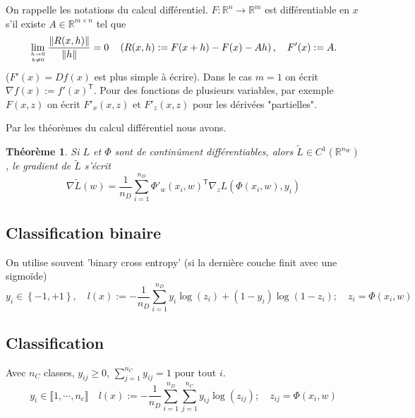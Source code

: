 \documentclass[11pt,a4paper]{article}
\newcommand{\nparammodel}{n_W}
\newcommand{\ndata}{n_D}
\newcommand{\R}{\mathbb R}
\newcommand{\norm}[1]{\|#1\|}
\newcommand{\Set}[1]{\left\{#1\right\}}
\newcommand{\transpose}[1]{{#1}^{\mathsf{T}}}
\newtheorem{theorem}{Théorème}[section]
\begin{document}
%
On rappelle les notations du calcul différentiel. $F:\R^n\to\R^m$ est différentiable en $x$ s'il existe $A\in\R^{m\times n}$ tel que 
\begin{align*}
\lim_{h\to 0\atop h\ne0}\frac{\norm{R(x,h)}}{\norm{h}} = 0\quad \left(R(x,h) := F(x+h)-F(x) - Ah\right),\quad F'(x) := A.
\end{align*}
($F'(x)= Df(x)$ est plus simple à écrire).
Dans le cas $m=1$ on écrit $\nabla f(x) := \transpose{f'(x)}$. Pour des fonctions de plusieurs variables, par exemple $F(x,z)$ on écrit 
$F'_x(x,z)$ et $F'_z(x,z)$ pour les dérivées  "partielles".

Par les théorèmes du calcul différentiel nous avons.
%
\begin{theorem}\label{theorem:}
Si $L$ et $\Phi$ sont de continûment différentiables, alors   $\widetilde{L}\in C^1(\R^{\nparammodel})$, le gradient de $\widetilde{L}$ s'écrit
%
\begin{equation}\label{equation:}
\nabla  \widetilde{L}(w) = \frac{1}{\ndata}\sum_{i=1}^{\ndata} \transpose{\Phi'_w(x_i,w)}\nabla_z L(\Phi(x_i,w),y_i)
\end{equation}
%
\end{theorem}
%
%
\subsection{Classification binaire}\label{subsec:}
%
On utilise souvent 'binary cross entropy' (si la dernière couche finit avec une sigmoïde)
%
\begin{equation}\label{equation:}
y_i \in \Set{-1,+1},\quad l(x) := -\frac{1}{\ndata}\sum_{i=1}^{\ndata} y_i\log(z_i)+(1-y_i)\log(1-z_i);\quad z_i = \Phi(x_i,w)
\end{equation}
%
%
\subsection{Classification}\label{subsec:}
%
Avec $n_C$ classes, $y_{ij}\ge0 $, $\sum_{j=1}^{n_C}y_{ij}=1$ pour tout $i$.
%
\begin{equation}\label{equation:}
y_i \in \llbracket 1,\cdots, n_c\rrbracket \quad l(x) := -\frac{1}{\ndata}\sum_{i=1}^{\ndata}\sum_{j=1}^{n_C} y_{ij}\log(z_{ij});\quad z_{ij} = \Phi(x_i,w)
\end{equation}
%
%
\end{document}
